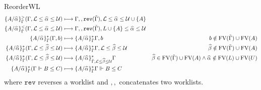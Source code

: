 \documentclass{article}
\theoremstyle{definition}
\begin{document}
\clearpage
\newpage
\phantom{}

\begin{figure}[!t]
{\small 
\hfill {} \hfill ReorderWL
 $$\begin{aligned}
 \{A/\al\}_{\tilde\Gamma}^{>} (\Gamma, \mathcal{L}\le\al\le\mathcal{U}) &\longmapsto \Gamma,, \texttt{rev}({\tilde\Gamma}), \mathcal{L}\le \al\le\mathcal{U}\cup\{A\}&  \\
 \{A/\al\}_{\tilde\Gamma}^{<} (\Gamma, \mathcal{L}\le\al\le\mathcal{U}) &\longmapsto \Gamma,, \texttt{rev}({\tilde\Gamma}), L\cup\{A\}\le \al\le\mathcal{U}& \\
 \{A/\al\}_{\tilde\Gamma}^{*} (\Gamma, b) &\longmapsto \{A/\al\}_{\tilde\Gamma}^{*}\Gamma, b \qquad &b \notin \text{FV}(\tilde\Gamma)\cup\text{FV}(A) \\
  \{A/\al\}_{\tilde\Gamma}^{*} (\Gamma, \mathcal{L}\le\bt\le\mathcal{U}) &\longmapsto \{A/\al\}_{\tilde\Gamma}^{*}\Gamma, \mathcal{L}\le\bt\le\mathcal{U}  &\bt \notin \text{FV}(\tilde\Gamma)\cup\text{FV}(A) \\
  \{A/\al\}_{\tilde\Gamma}^{*} (\Gamma, \mathcal{L}\le\bt\le\mathcal{U}) &\longmapsto \{A/\al\}_{\tilde\Gamma, \mathcal{L}\le \bt\le\mathcal{U}}^{*}\Gamma  &\bt \in \text{FV}(\tilde\Gamma)\cup\text{FV}(A) \wedge \al \notin \text{FV}(L)\cup\text{FV}(U) \\
  \{A/\al\}_{\tilde\Gamma}^{*} (\Gamma\Vdash B\le C) &\longmapsto \{A/\al\}_{\tilde\Gamma}^{*}\Gamma\Vdash B\le C  & \\

\end{aligned}
$$
} 
where $\texttt{rev}$ reverses a worklist and $,,$ concatenates two worklists.

\end{figure}
\end{document}
